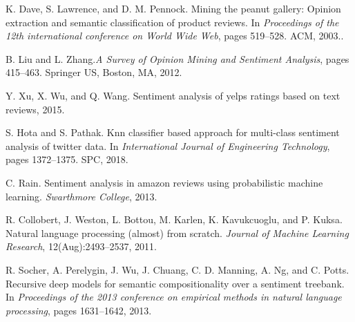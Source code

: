 \documentclass[10pt]{article}
\begin{document}
\begin{thebibliography}{9}
{
K. Dave, S. Lawrence, and D. M. Pennock. Mining the
peanut gallery: Opinion extraction and semantic classification
of product reviews. In \textit{Proceedings of the 12th international
conference on World Wide Web}, pages 519–528. ACM, 2003..

B. Liu and L. Zhang.\textit{A Survey of Opinion Mining and Sentiment Analysis}, pages 415–463. Springer US, Boston, MA,
2012.

Y. Xu, X. Wu, and Q. Wang. Sentiment analysis of yelps
ratings based on text reviews, 2015.

S. Hota and S. Pathak. Knn classifier based approach for
multi-class sentiment analysis of twitter data. In \textit{International
Journal of Engineering Technology}, pages 1372–1375. SPC,
2018.

C. Rain. Sentiment analysis in amazon reviews using probabilistic machine learning. \textit{Swarthmore College}, 2013.

R. Collobert, J. Weston, L. Bottou, M. Karlen,
K. Kavukcuoglu, and P. Kuksa. Natural language processing (almost) from scratch. \textit{Journal of Machine Learning
Research}, 12(Aug):2493–2537, 2011.}

R. Socher, A. Perelygin, J. Wu, J. Chuang, C. D. Manning,
A. Ng, and C. Potts. Recursive deep models for semantic
compositionality over a sentiment treebank. In \textit{Proceedings
of the 2013 conference on empirical methods in natural language processing}, pages 1631–1642, 2013.

\end{thebibliography}
\end{document}
